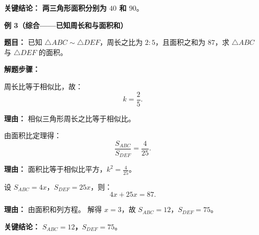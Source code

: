 \begin{examplebox}
	\textbf{\textcolor{CExample}{关键结论：}}
	\textbf{两三角形面积分别为 $40$ 和 $90$}。

	\medskip
	\textbf{\textcolor{CExample}{例 3（综合——已知周长和与面积和）}}

	\textbf{\textcolor{CExample}{题目：}}
	已知 $\triangle ABC\sim\triangle DEF$，周长之比为 $2:5$，且面积之和为 $87$，求 $\triangle ABC$ 与 $\triangle DEF$ 的面积。

	\textbf{\textcolor{CExample}{解题步骤：}}
	\begin{description}[style=nextline, leftmargin=2.8em, labelsep=0.5em, itemsep=0.45em]
		\item[\textbf{第一步（周长比得相似比）：}]
			周长比等于相似比，故：
			\[
				k=\frac{2}{5}.
			\]
			\par\textbf{理由：} 相似三角形周长之比等于相似比。
		\item[\textbf{第二步（计算面积比）：}]
			由面积比定理得：
			\[
				\frac{S_{ABC}}{S_{DEF}} = \frac{4}{25}.
			\]
			\par\textbf{理由：} 面积比等于相似比平方，$k^2=\frac{4}{25}$。
		\item[\textbf{第三步（列方程求解）：}]
			设 $S_{ABC}=4x$，$S_{DEF}=25x$，则：
			\[
				4x+25x=87.
			\]
			\par\textbf{理由：} 由面积和列方程。
			解得 $x=3$，故 $S_{ABC}=12$，$S_{DEF}=75$。
	\end{description}

	\textbf{\textcolor{CExample}{关键结论：}}
	\textbf{$S_{ABC}=12$，$S_{DEF}=75$}。
\end{examplebox}

